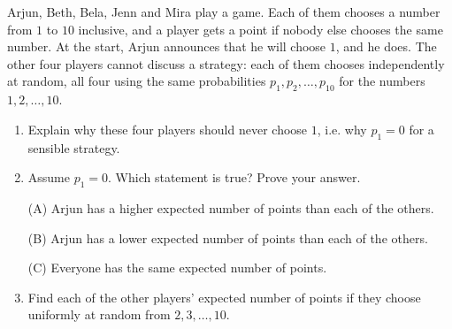 Arjun, Beth, Bela, Jenn and Mira play a game. Each of them chooses a number from $1$ to $10$ inclusive, and a player gets a point if nobody else chooses the same number. At the start, Arjun announces that he will choose $1$, and he does. The other four players cannot discuss a strategy: each of them chooses independently at random, all four using the same probabilities $p_1,p_2,\dots,p_{10}$ for the numbers $1,2,\dots,10$.
\begin{enumerate}
\item[(a)] Explain why these four players should never choose $1$, i.e. why $p_1=0$ for a sensible strategy.
\item[(b)] Assume $p_1=0$. Which statement is true? Prove your answer.

(A) Arjun has a higher expected number of points than each of the others.

(B) Arjun has a lower expected number of points than each of the others.

(C) Everyone has the same expected number of points.
\item[(c)] Find each of the other players' expected number of points if they choose uniformly at random from $2,3,\dots,10$.
\end{enumerate}
